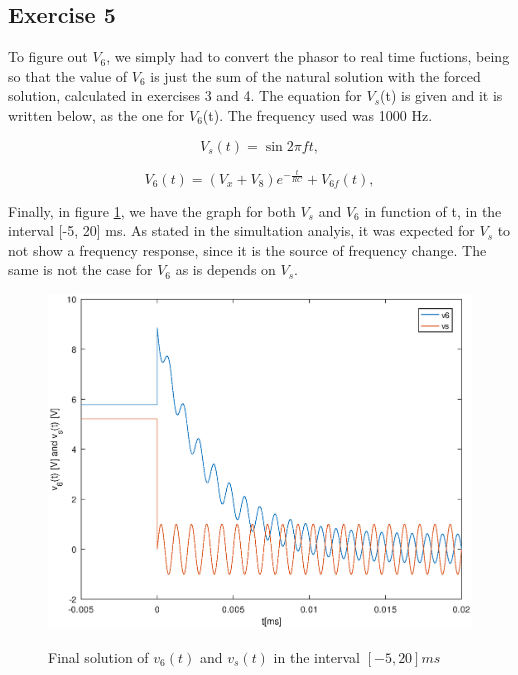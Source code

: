 \newpage
\subsection{Exercise 5}
\label{sec:exercise5}


To figure out $V_6$, we simply had to convert the phasor to real time fuctions, being so that the value of $V_6$ is just the sum of the natural solution with the forced solution, calculated in exercises 3 and 4. The equation for $V_s$(t) is given and it is written below, as the one for $V_6$(t). The frequency used was 1000 Hz. 

\begin{equation}
   V_{s}(t) =  \sin{2{\pi}ft},
  \label{eq:vsgiven}
\end{equation}

\begin{equation}
  V_{6}(t) = (V_{x} + V_{8})e^{-\frac{t}{RC}} + V_{6f}(t),
  \label{eq:v6tot}
\end{equation}

Finally, in figure \ref{fig:theoretical_5}, we have the graph for both $V_s$ and $V_6$ in function of t, in the interval [-5, 20] ms. As stated in the simultation analyis, it was expected for $V_s$ to not show a frequency response, since it is the source of frequency change. The same is not the case for $V_6$ as is depends on $V_s$.

\begin{figure}[!ht] \centering
\caption{Final solution of $v_6(t)$ and $v_s(t)$ in the interval $[-5,20]ms$}
\includegraphics[width=0.8\linewidth]{theoretical_5.eps}
\label{fig:theoretical_5}
\end{figure}

